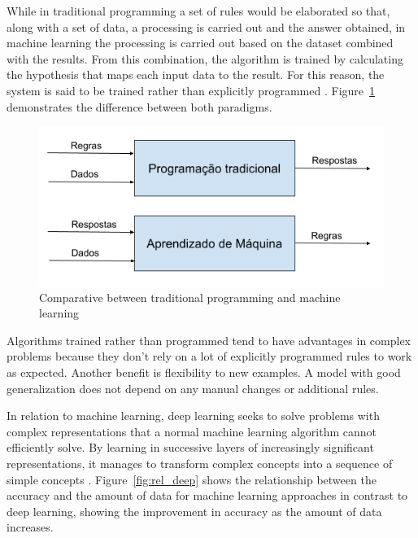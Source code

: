\documentclass[a4paper,fleqn]{cas-sc}
\begin{document}
While in traditional programming a set of rules would be elaborated so that, along with a set of data, a processing is carried out and the answer obtained, in machine learning the processing is carried out based on the dataset combined with the results. From this combination, the algorithm is trained by calculating the hypothesis that maps each input data to the result. For this reason, the system is said to be trained rather than explicitly programmed \cite{chollet2017deep}. Figure~\ref{fig:progxml} demonstrates the difference between both paradigms.

\begin{figure}[h!]
	\caption{Comparative between traditional programming and machine learning}
	\label{fig:progxml}
	\centering%
	\begin{minipage}{.6\textwidth}
		\includegraphics[width=\textwidth]{images/prog_ml.png}
	\end{minipage}
\end{figure}

Algorithms trained rather than programmed tend to have advantages in complex problems because they don't rely on a lot of explicitly programmed rules to work as expected. Another benefit is flexibility to new examples. A model with good generalization does not depend on any manual changes or additional rules.

In relation to machine learning, deep learning seeks to solve problems with complex representations that a normal machine learning algorithm cannot efficiently solve. By learning in successive layers of increasingly significant representations, it manages to transform complex concepts into a sequence of simple concepts \cite{chollet2017deep}. Figure~\ref{fig:rel_deep} shows the relationship between the accuracy and the amount of data for machine learning approaches in contrast to deep learning, showing the improvement in accuracy as the amount of data increases.
\end{document}
